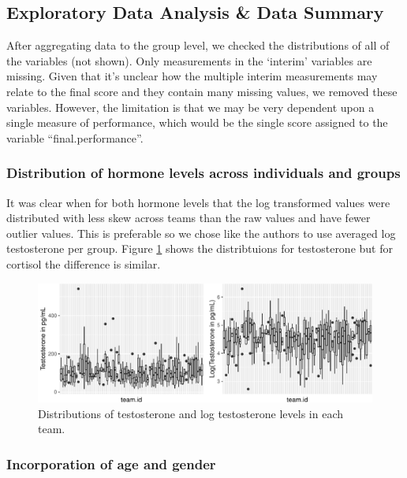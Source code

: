 \documentclass[]{article}
\begin{document}
\subsection{Exploratory Data Analysis \& Data
Summary}\label{exploratory-data-analysis-data-summary}

After aggregating data to the group level, we checked the distributions
of all of the variables (not shown). Only measurements in the `interim'
variables are missing. Given that it's unclear how the multiple interim
measurements may relate to the final score and they contain many missing
values, we removed these variables. However, the limitation is that we
may be very dependent upon a single measure of performance, which would
be the single score assigned to the variable ``final.performance''.

\subsubsection{Distribution of hormone levels across individuals and
groups}\label{distribution-of-hormone-levels-across-individuals-and-groups}

It was clear when for both hormone levels that the log transformed
values were distributed with less skew across teams than the raw values
and have fewer outlier values. This is preferable so we chose like the
authors to use averaged log testosterone per group. Figure
\ref{fig:test} shows the distribtuions for testosterone but for cortisol
the difference is similar.

\begin{figure}
\centering
\includegraphics{19_10_27_hw7_q1_files/figure-latex/test-1.pdf}
\caption{\label{fig:test}Distributions of testosterone and log
testosterone levels in each team.}
\end{figure}

\subsubsection{Incorporation of age and
gender}\label{incorporation-of-age-and-gender}
\end{document}
